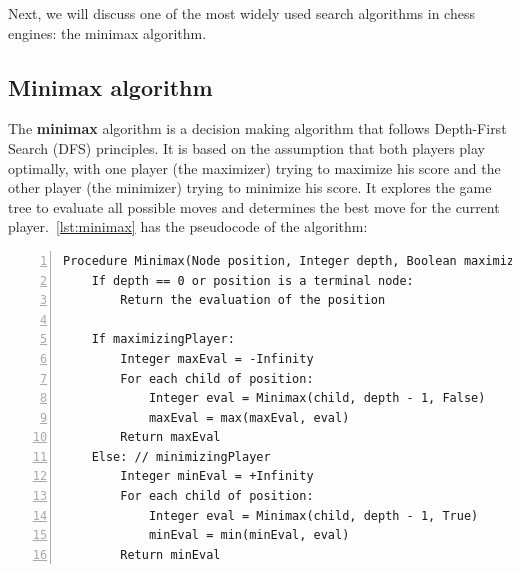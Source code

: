 \vspace{1em}

\noindent Next, we will discuss one of the most widely used search algorithms in chess engines: the minimax algorithm.

\subsection{Minimax algorithm}\label{sec:minimax}

The \textbf{minimax} algorithm is a decision making algorithm that follows Depth-First Search (DFS) principles. It is based on the assumption that both players play optimally, with one player (the maximizer) trying to maximize his score and the other player (the minimizer) trying to minimize his score. It explores the game tree to evaluate all possible moves and determines the best move for the current player.~\cref{lst:minimax} has the pseudocode of the algorithm:

\vspace{1em}

\begin{lstlisting}[caption={Pseudocode of the Minimax algorithm.}, label={lst:minimax}, frame=single, numbers=left, xleftmargin=15pt, breaklines=true]
Procedure Minimax(Node position, Integer depth, Boolean maximizingPlayer):
    If depth == 0 or position is a terminal node:
        Return the evaluation of the position

    If maximizingPlayer:
        Integer maxEval = -Infinity
        For each child of position:
            Integer eval = Minimax(child, depth - 1, False)
            maxEval = max(maxEval, eval)
        Return maxEval
    Else: // minimizingPlayer
        Integer minEval = +Infinity
        For each child of position:
            Integer eval = Minimax(child, depth - 1, True)
            minEval = min(minEval, eval)
        Return minEval
\end{lstlisting}

